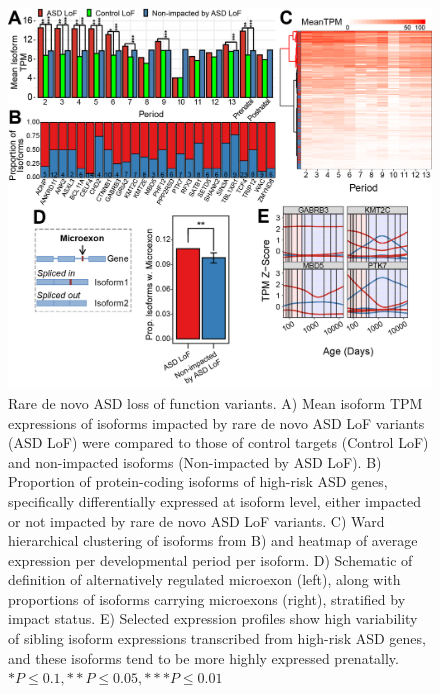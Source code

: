 \documentclass[12pt,chapterheads,final]{ucsd}
\begin{document}
\begin{figure}[h]
  \centering
  \includegraphics[width=\textwidth]{figure2}
  \caption[Rare de novo ASD loss of function variants.]
{Rare de novo ASD loss of function variants. A) Mean isoform TPM expressions of isoforms impacted by rare de novo ASD LoF variants (ASD LoF) were compared to those of control targets (Control LoF) and non-impacted isoforms (Non-impacted by ASD LoF). B) Proportion of protein-coding isoforms of high-risk ASD genes, specifically differentially expressed at isoform level, either impacted or not impacted by rare de novo ASD LoF variants. C) Ward hierarchical clustering of isoforms from B) and heatmap of average expression per developmental period per isoform. D) Schematic of definition of alternatively regulated microexon (left), along with proportions of isoforms carrying microexons (right), stratified by impact status. E) Selected expression profiles show high variability of sibling isoform expressions transcribed from high-risk ASD genes, and these isoforms tend to be more highly expressed prenatally. $*P \leq 0.1, **P \leq 0.05, ***P \leq 0.01$}
\end{figure}
\end{document}
